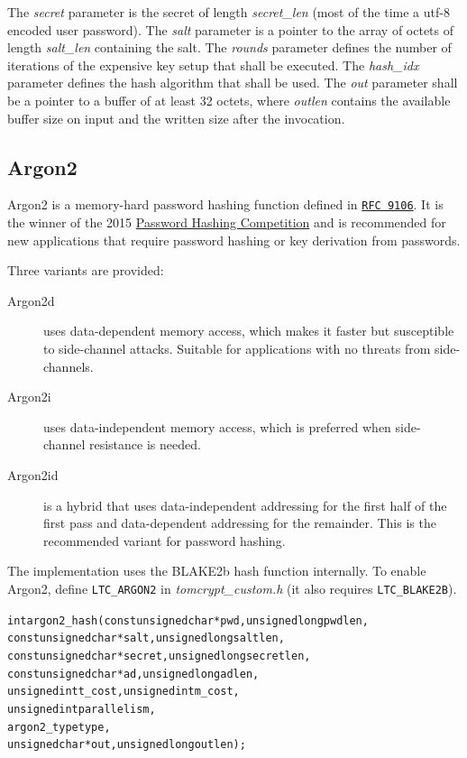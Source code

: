 \documentclass[synpaper]{book}
\begin{document}
The \textit{secret} parameter is the secret of length \textit{secret\_len} (most of the time a utf-8 encoded user password).
The \textit{salt} parameter is a pointer to the array of octets of length \textit{salt\_len} containing the salt.
The \textit{rounds} parameter defines the number of iterations of the expensive key setup that shall be executed.
The \textit{hash\_idx} parameter defines the hash algorithm that shall be used.
The \textit{out} parameter shall be a pointer to a buffer of at least 32 octets,
where \textit{outlen} contains the available buffer size on input and the written size after the invocation.


\subsection{Argon2}
\label{argon2}

Argon2 is a memory-hard password hashing function defined in \href{https://datatracker.ietf.org/doc/html/rfc9106}{\texttt{RFC 9106}}.
It is the winner of the 2015 \href{https://www.password-hashing.net/}{Password Hashing Competition} and is recommended for new applications that require password hashing or key derivation from passwords.

Three variants are provided:

\begin{description}
\item[Argon2d] uses data-dependent memory access, which makes it faster but susceptible to side-channel attacks. Suitable for applications with no threats from side-channels.
\item[Argon2i] uses data-independent memory access, which is preferred when side-channel resistance is needed.
\item[Argon2id] is a hybrid that uses data-independent addressing for the first half of the first pass and data-dependent addressing for the remainder. This is the recommended variant for password hashing.
\end{description}

The implementation uses the BLAKE2b hash function internally.  To enable Argon2, define \texttt{LTC\_ARGON2} in \textit{tomcrypt\_custom.h} (it also requires \texttt{LTC\_BLAKE2B}).

\begin{alltt}
int argon2_hash(const unsigned char *pwd,  unsigned long pwdlen,
                const unsigned char *salt, unsigned long saltlen,
                const unsigned char *secret, unsigned long secretlen,
                const unsigned char *ad, unsigned long adlen,
                unsigned int t_cost, unsigned int m_cost,
                unsigned int parallelism,
                argon2_type type,
                unsigned char *out, unsigned long outlen);
\end{alltt}
\end{document}
